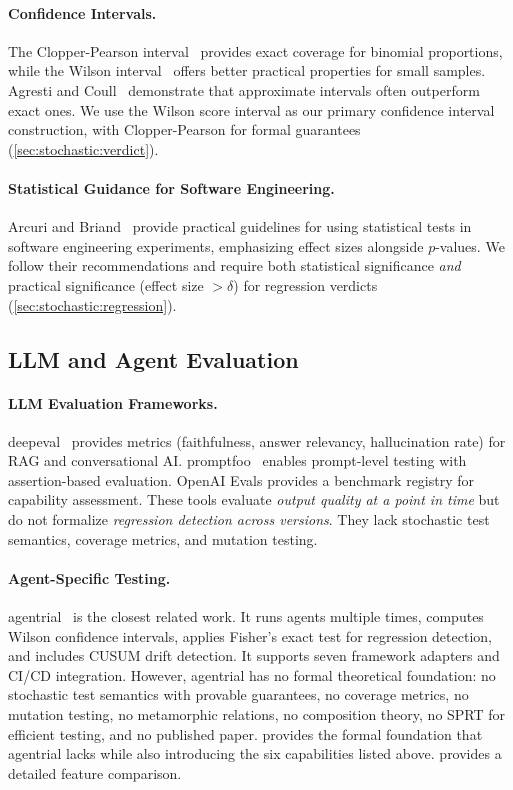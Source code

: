 \paragraph{Confidence Intervals.}
The Clopper-Pearson interval~\citep{clopper1934use} provides exact
coverage for binomial proportions, while the Wilson
interval~\citep{wilson1927probable} offers better practical properties
for small samples. Agresti and Coull~\citep{agresti1998approximate}
demonstrate that approximate intervals often outperform exact ones. We
use the Wilson score interval as our primary confidence interval
construction, with Clopper-Pearson for formal guarantees
(\cref{sec:stochastic:verdict}).

\paragraph{Statistical Guidance for Software Engineering.}
Arcuri and Briand~\citep{arcuri2011practical} provide practical
guidelines for using statistical tests in software engineering
experiments, emphasizing effect sizes alongside $p$-values. We follow
their recommendations and require both statistical significance
\emph{and} practical significance (effect size $> \delta$) for regression
verdicts (\cref{sec:stochastic:regression}).

\subsection{LLM and Agent Evaluation}
\label{sec:related:evaluation}

\paragraph{LLM Evaluation Frameworks.}
deepeval~\citep{deepeval2024} provides metrics (faithfulness, answer
relevancy, hallucination rate) for RAG and conversational AI.
promptfoo~\citep{promptfoo2024} enables prompt-level testing with
assertion-based evaluation. OpenAI Evals provides a benchmark registry
for capability assessment. These tools evaluate \emph{output quality at
a point in time} but do not formalize \emph{regression detection across
versions}. They lack stochastic test semantics, coverage metrics, and
mutation testing.

\paragraph{Agent-Specific Testing.}
agentrial~\citep{agentrial2026} is the closest related work. It runs
agents multiple times, computes Wilson confidence intervals, applies
Fisher's exact test for regression detection, and includes CUSUM drift
detection. It supports seven framework adapters and CI/CD integration.
However, agentrial has no formal theoretical foundation: no stochastic
test semantics with provable guarantees, no coverage metrics, no
mutation testing, no metamorphic relations, no composition theory, no
SPRT for efficient testing, and no published paper. \agentassay{}
provides the formal foundation that agentrial lacks while also
introducing the six capabilities listed above. 
provides a detailed feature comparison.

